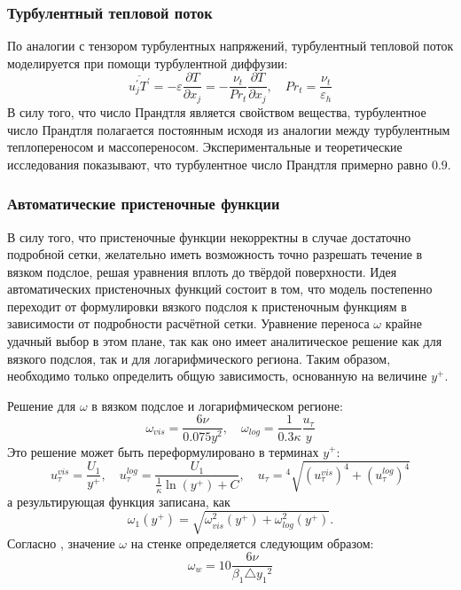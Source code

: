 			\subsubsection{Турбулентный тепловой поток}
			По аналогии с тензором турбулентных напряжений, турбулентный тепловой поток моделируется при помощи турбулентной диффузии:
				\begin{equation}
					\overline{u^{'}_jT^{'}} = - \varepsilon \frac{\partial T}{\partial x_j} = -\frac{\nu_t}{Pr_t}\frac{\partial T}{\partial x_j}, \quad Pr_t = \frac{\nu_t}{\varepsilon_h}
				\end{equation}
				В силу того, что число Прандтля является свойством вещества, турбулентное число Прандтля полагается постоянным исходя из аналогии между турбулентным теплопереносом и массопереносом. Экспериментальные и теоретические исследования показывают, что турбулентное число Прандтля примерно равно $0.9$.
			\subsubsection{Автоматические пристеночные функции}
				В силу того, что пристеночные функции некорректны в случае достаточно подробной сетки, желательно иметь возможность точно разрешать течение в вязком подслое, решая уравнения вплоть до твёрдой поверхности. Идея автоматических пристеночных функций состоит в том, что модель постепенно переходит от формулировки вязкого подслоя к пристеночным функциям в зависимости от подробности расчётной сетки. Уравнение переноса $\omega$ крайне удачный выбор в этом плане, так как оно имеет аналитическое решение как для вязкого подслоя, так и для логарифмического региона. Таким образом, необходимо только определить общую зависимость, основанную на величине $y^{+}$.
				
				Решение для $\omega$ в вязком подслое и логарифмическом регионе:
				\begin{equation}
					\omega_{vis} = \frac{6\nu}{0.075 y^2}, \quad \omega_{log} = \frac{1}{0.3 \kappa}\frac{u_{\tau}}{y}
				\end{equation}
				Это решение может быть переформулировано в терминах $y^{+}$:
				\begin{equation}
						u_{\tau}^{vis} = \frac{U_1}{y^{+}}, \quad u_{\tau}^{log} = \frac{U_1}{\frac{1}{\kappa}\ln(y^{+})+C}, \quad u_{\tau} = {}^4\sqrt{(u_{\tau}^{vis})^4 + (u_{\tau}^{log})^4}
				\end{equation}
				а результирующая функция записана, как
				\begin{equation}
					\omega_1(y^{+})=\sqrt{\omega^2_{vis}(y^{+})+\omega^2_{log}(y^{+})}.
				\end{equation}
				Согласно \cite{Garbarek}, значение $\omega$ на стенке определяется следующим образом:
		\begin{equation}
			\omega_w = 10 \frac{6\nu}{\beta_1 \triangle{y_1}^2}
		\end{equation}
	\newpage
